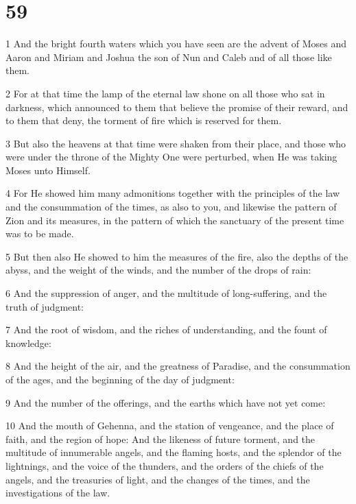 \chapter{59}

\par 1 And the bright fourth waters which you have seen are the advent of Moses and Aaron and Miriam and Joshua the son of Nun and Caleb and of all those like them. 

\par 2 For at that time the lamp of the eternal law shone on all those who sat in darkness, which announced to them that believe the promise of their reward, and to them that deny, the torment of fire which is reserved for them. 

\par 3 But also the heavens at that time were shaken from their place, and those who were under the throne of the Mighty One were perturbed, when He was taking Moses unto Himself. 

\par 4 For He showed him many admonitions together with the principles of the law and the consummation of the times, as also to you, and likewise the pattern of Zion and its measures, in the pattern of which the sanctuary of the present time was to be made. 

\par 5 But then also He showed to him the measures of the fire, also the depths of the abyss, and the weight of the winds, and the number of the drops of rain: 

\par 6 And the suppression of anger, and the multitude of long-suffering, and the truth of judgment: 

\par 7 And the root of wisdom, and the riches of understanding, and the fount of knowledge: 

\par 8 And the height of the air, and the greatness of Paradise, and the consummation of the ages, and the beginning of the day of judgment: 

\par 9 And the number of the offerings, and the earths which have not yet come: 

\par 10 And the mouth of Gehenna, and the station of vengeance, and the place of faith, and the region of hope: And the likeness of future torment, and the multitude of innumerable angels, and the flaming hosts, and the splendor of the lightnings, and the voice of the thunders, and the orders of the chiefs of the angels, and the treasuries of light, and the changes of the times, and the investigations of the law. 

